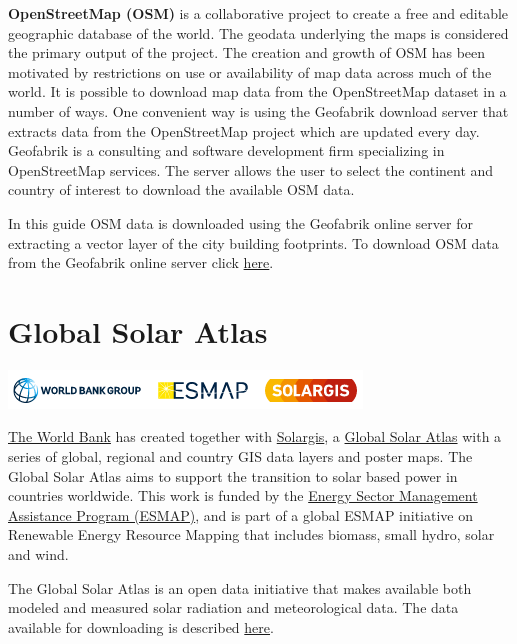 \documentclass[
]{book}
\begin{document}
\textbf{OpenStreetMap (OSM)} is a collaborative project to create a free and editable geographic database of the world. The geodata underlying the maps is considered the primary output of the project. The creation and growth of OSM has been motivated by restrictions on use or availability of map data across much of the world. It is possible to download map data from the OpenStreetMap dataset in a number of ways. One convenient way is using the Geofabrik download server that extracts data from the OpenStreetMap project which are updated every day. Geofabrik is a consulting and software development firm specializing in OpenStreetMap services. The server allows the user to select the continent and country of interest to download the available OSM data.

In this guide OSM data is downloaded using the Geofabrik online server for extracting a vector layer of the city building footprints. To download OSM data from the Geofabrik online server click \href{http://download.geofabrik.de/}{here}.

\hypertarget{global-solar-atlas}{%
\section{Global Solar Atlas}\label{global-solar-atlas}}

\begin{center}\includegraphics[width=0.6\linewidth]{images/solaratlas} \end{center}

\href{www.worldbank.org/}{The World Bank} has created together with \href{https://solargis.com/}{Solargis}, a \href{https://globalsolaratlas.info/map}{Global Solar Atlas} with a series of global, regional and country GIS data layers and poster maps. The Global Solar Atlas aims to support the transition to solar based power in countries worldwide. This work is funded by the \href{http://www.esmap.org/RE_Mapping}{Energy Sector Management Assistance Program (ESMAP)}, and is part of a global ESMAP initiative on Renewable Energy Resource Mapping that includes biomass, small hydro, solar and wind.

The Global Solar Atlas is an open data initiative that makes available both modeled and measured solar radiation and meteorological data. The data available for downloading is described \href{https://globalsolaratlas.info/support/data-outputs}{here}.
\end{document}
